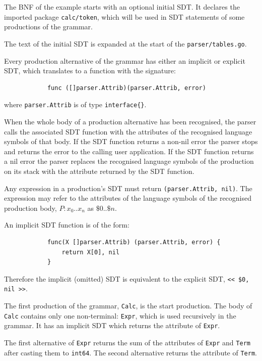 \documentclass[12pt]{article}
\begin{document}
		The BNF of the example starts with an optional initial SDT. It declares the imported package \verb|calc/token|, which will be used in SDT statements of some productions of the grammar. 

		The text of the initial SDT is expanded at the start of the \verb|parser/tables.go|.

		Every production alternative of the grammar has either an implicit or explicit SDT, which translates to a function with the signature:

		\begin{verbatim}
			func ([]parser.Attrib)(parser.Attrib, error)
		\end{verbatim}

		where \verb|parser.Attrib| is of type \verb|interface{}|.

		When the whole body of a production alternative has been recognised, the parser calls the associated SDT function with the attributes of the recognised language symbols of that body. If the SDT function returns a non-nil error the parser stops and returns the error to the calling user application. If the SDT function returns a nil error the parser replaces the recognised language symbols of the production on its stack with the attribute returned by the SDT function.

		Any expression in a production's SDT must return \verb|(parser.Attrib, nil)|. The expression may refer to the attributes of the language symbols of the recognised production body, $P : x_0 .. x_n$ as $\$0 .. \$n$.

		An implicit SDT function is of the form:

		\begin{verbatim}
			func(X []parser.Attrib) (parser.Attrib, error) {
			    return X[0], nil
			}
		\end{verbatim}

		Therefore the implicit (omitted) SDT is equivalent to the explicit SDT, \verb|<< $0, nil >>|.


		The first production of the grammar, \verb|Calc|,  is the start production. The body of \verb|Calc| contains only one non-terminal: \verb|Expr|, which is used recursively in the grammar. It has an implicit SDT which returns the attribute of \verb|Expr|.

		The first alternative of \verb|Expr| returns the sum of the attributes of \verb|Expr| and \verb|Term| after casting them to \verb|int64|. The second alternative returns the attribute of \verb|Term|.
\end{document}
